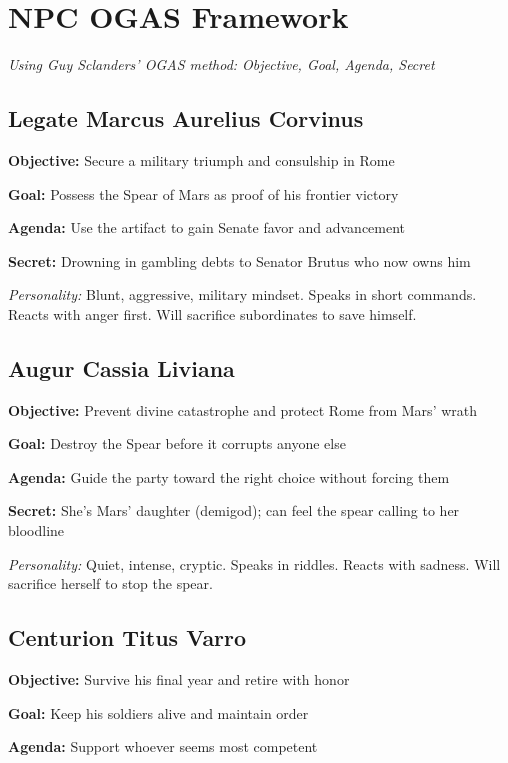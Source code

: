 \documentclass[letterpaper,oneside,twocolumn,openany]{dndbook}
\begin{document}
\section{NPC OGAS Framework}

\textit{Using Guy Sclanders' OGAS method: Objective, Goal, Agenda, Secret}

\subsection{Legate Marcus Aurelius Corvinus}

\textbf{Objective:} Secure a military triumph and consulship in Rome

\textbf{Goal:} Possess the Spear of Mars as proof of his frontier victory

\textbf{Agenda:} Use the artifact to gain Senate favor and advancement

\textbf{Secret:} Drowning in gambling debts to Senator Brutus who now owns him

\textit{Personality:} Blunt, aggressive, military mindset. Speaks in short commands. Reacts with anger first. Will sacrifice subordinates to save himself.

\subsection{Augur Cassia Liviana}

\textbf{Objective:} Prevent divine catastrophe and protect Rome from Mars' wrath

\textbf{Goal:} Destroy the Spear before it corrupts anyone else

\textbf{Agenda:} Guide the party toward the right choice without forcing them

\textbf{Secret:} She's Mars' daughter (demigod); can feel the spear calling to her bloodline

\textit{Personality:} Quiet, intense, cryptic. Speaks in riddles. Reacts with sadness. Will sacrifice herself to stop the spear.

\subsection{Centurion Titus Varro}

\textbf{Objective:} Survive his final year and retire with honor

\textbf{Goal:} Keep his soldiers alive and maintain order

\textbf{Agenda:} Support whoever seems most competent
\end{document}
